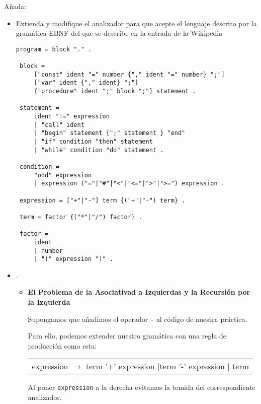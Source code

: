 Añada:
\begin{itemize}
\item Extienda y modifique el analizador para que acepte el lenguaje 
descrito por la gramática EBNF del 
 que se describe en la 
entrada de la Wikipedia 
\begin{verbatim}
program = block "." .
 
 block =
     ["const" ident "=" number {"," ident "=" number} ";"]
     ["var" ident {"," ident} ";"]
     {"procedure" ident ";" block ";"} statement .
 
 statement =
     ident ":=" expression
     | "call" ident
     | "begin" statement {";" statement } "end"
     | "if" condition "then" statement
     | "while" condition "do" statement .
 
 condition =
     "odd" expression
     | expression ("="|"#"|"<"|"<="|">"|">=") expression .
 
 expression = ["+"|"-"] term {("+"|"-") term} .
 
 term = factor {("*"|"/") factor} .
 
 factor =
     ident
     | number
     | "(" expression ")" .
\end{verbatim}
\item
{}. 

\begin{itemize}
\item
{\bf El Problema de la Asociativad a Izquierdas y la Recursión por la Izquierda}

Supongamos que añadimos el operador \verb|-| al código de nuestra práctica. 

Para ello, podemos extender nuestro gramática  con una regla
de producción como esta:
\begin{center}
\vspace{0.25cm}
\begin{tabular}{|l|}
expression   $\rightarrow$ term '+' expression $|$term '-' expression $|$ term\\
\end{tabular}
\end{center}
\vspace{0.25cm}

Al poner \verb|expression| a la derecha evitamos la temida 
del correspondiente analizador.


\end{itemize}
\end{itemize}
